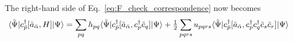 \documentclass[aip,jcp,preprint,superscriptaddress,nofootinbib]{revtex4-1}
\begin{document}
The right-hand side of Eq.~\eqref{eq:F_check_correspondence} now becomes
\begin{align}
    \langle \tilde{\Psi} \vert  c^{\dagger}_{\bar{p}} [\tilde{a}_{\bar{\alpha}}, H]  \vert \Psi \rangle 
    &= \sum_{pq} h_{pq} \langle \tilde{\Psi} \vert  c^{\dagger}_{\bar{p}} [\tilde{a}_{\bar{\alpha}}, c^{\dagger}_{p} \tilde{c}_{q}]  \vert \Psi \rangle
    + \tfrac{1}{2} \sum_{pqrs} u_{pqrs} \langle \tilde{\Psi} \vert  c^{\dagger}_{\bar{p}} [\tilde{a}_{\bar{\alpha}}, c^{\dagger}_{p} c^{\dagger}_{q} \tilde{c}_{s} \tilde{c}_{r}]  \vert \Psi \rangle
\end{align}

\newpage

\end{document}
